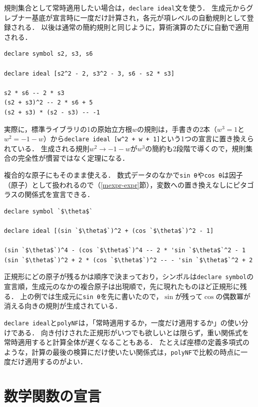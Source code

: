 規則集合として常時適用したい場合は，\lstinline{declare ideal}文を使う．
生成元からグレブナー基底が宣言時に一度だけ計算され，各元が項レベルの自動規則として登録される．
以後は通常の簡約規則と同じように，算術演算のたびに自動で適用される．
\begin{lstlisting}[language=egison,numbers=none]
declare symbol s2, s3, s6

declare ideal [s2^2 - 2, s3^2 - 3, s6 - s2 * s3]

s2 * s6 -- 2 * s3
(s2 + s3)^2 -- 2 * s6 + 5
(s2 + s3) * (s2 - s3) -- -1
\end{lstlisting}
実際に，標準ライブラリの1の原始立方根$w$の規則は，手書きの2本（$w^3 = 1$と$w^2 = -1-w$）から\lstinline{declare ideal [w^2 + w + 1]}という1つの宣言に置き換えられている．
生成される規則$w^2 \to -1-w$が$w^3$の簡約も2段階で導くので，規則集合の完全性が慣習ではなく定理になる．

複合的な原子にもそのまま使える．
数式データのなかで\lstinline{sin θ}や\lstinline{cos θ}は因子（原子）として扱われるので（\ref{mexpr-expr}節），変数への置き換えなしにピタゴラスの関係式を宣言できる．
\begin{lstlisting}[language=egison,numbers=none]
declare symbol `$\theta$`

declare ideal [(sin `$\theta$`)^2 + (cos `$\theta$`)^2 - 1]

(sin `$\theta$`)^4 - (cos `$\theta$`)^4 -- 2 * 'sin `$\theta$`^2 - 1
(sin `$\theta$`)^2 + 2 * (cos `$\theta$`)^2 -- - 'sin `$\theta$`^2 + 2
\end{lstlisting}
正規形にどの原子が残るかは順序で決まっており，シンボルは\lstinline{declare symbol}の宣言順，生成元のなかの複合原子は出現順で，先に現れたものほど正規形に残る．
上の例では生成元に\lstinline{sin θ}を先に書いたので，$\sin$が残って$\cos$の偶数冪が消える向きの規則が生成されている．

\lstinline{declare ideal}と\lstinline{polyNF}は，「常時適用するか，一度だけ適用するか」の使い分けである．
向き付けされた正規形がいつでも欲しいとは限らず，重い関係式を常時適用すると計算全体が遅くなることもある．
たとえば座標の定義多項式のような，計算の最後の検算にだけ使いたい関係式は，\lstinline{polyNF}で比較の時点に一度だけ適用するのがよい．

\section{数学関数の宣言}\label{casdetail-mathfunc}

